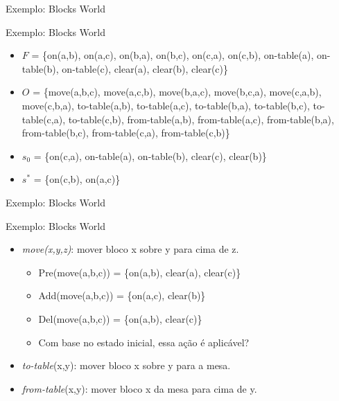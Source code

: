 \documentclass{beamer}
\begin{document}
\begin{frame}{Exemplo: Blocks World}
    \begin{exampleblock}{\strut Exemplo: Blocks World}
      \begin{itemize}
      \item $F$ = \{on(a,b), on(a,c), on(b,a), on(b,c), on(c,a), on(c,b), on-table(a), on-table(b), on-table(c), clear(a), clear(b), clear(c)\}

       \item $O$ = \{move(a,b,c), move(a,c,b), move(b,a,c), move(b,c,a), move(c,a,b), move(c,b,a), to-table(a,b), to-table(a,c), to-table(b,a), to-table(b,c), to-table(c,a), to-table(c,b), from-table(a,b), from-table(a,c), from-table(b,a), from-table(b,c), from-table(c,a), from-table(c,b)\}

        \item $s_{0}$ = \{on(c,a), on-table(a), on-table(b), clear(c), clear(b)\}

         \item $s^{*}$ = \{on(c,b), on(a,c)\}
      \end{itemize}
    \end{exampleblock}
\end{frame}

\begin{frame}{Exemplo: Blocks World}
    \begin{exampleblock}{\strut Exemplo: Blocks World}
      \begin{itemize}
      \item \emph{move(x,y,z)}: mover bloco x sobre y para cima de z.
      \begin{itemize}
        \item Pre(move(a,b,c)) = \{on(a,b), clear(a), clear(c)\}
        \item Add(move(a,b,c)) = \{on(a,c), clear(b)\}
        \item Del(move(a,b,c)) = \{on(a,b), clear(c)\}
        \item Com base no estado inicial, essa ação é aplicável? %
      \end{itemize}
      \item \emph{to-table}(x,y): mover bloco x sobre y para a mesa.
      \item \emph{from-table}(x,y): mover bloco x da mesa para cima de y.
      \end{itemize}
    \end{exampleblock}
\end{frame}
\end{document}

